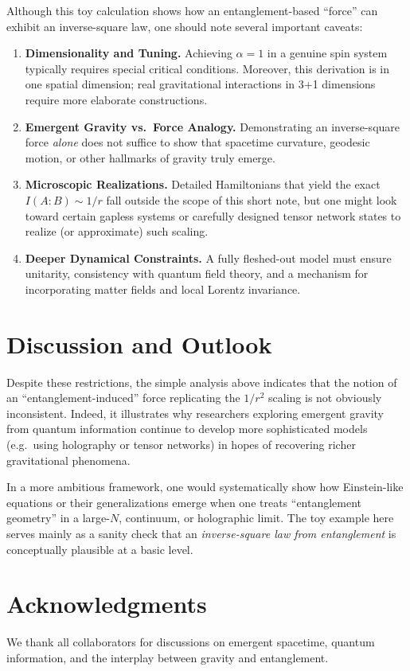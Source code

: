 \documentclass[12pt]{article}
\begin{document}
Although this toy calculation shows how an entanglement-based ``force'' 
can exhibit an inverse-square law, one should note several important 
caveats:

\begin{enumerate}
    \item \textbf{Dimensionality and Tuning.} 
    Achieving $\alpha = 1$ in a genuine spin system typically requires 
    special critical conditions. Moreover, this derivation is in 
    one spatial dimension; real gravitational interactions in 3+1 
    dimensions require more elaborate constructions.

    \item \textbf{Emergent Gravity vs.\ Force Analogy.} 
    Demonstrating an inverse-square force \emph{alone} does not 
    suffice to show that spacetime curvature, geodesic motion, 
    or other hallmarks of gravity truly emerge. 

    \item \textbf{Microscopic Realizations.} 
    Detailed Hamiltonians that yield the exact $I(A:B) \sim 1/r$ 
    fall outside the scope of this short note, but one might look 
    toward certain gapless systems or carefully designed tensor 
    network states to realize (or approximate) such scaling.

    \item \textbf{Deeper Dynamical Constraints.} 
    A fully fleshed-out model must ensure unitarity, consistency 
    with quantum field theory, and a mechanism for incorporating 
    matter fields and local Lorentz invariance. 
\end{enumerate}

\section{Discussion and Outlook}

Despite these restrictions, the simple analysis above indicates that 
the notion of an ``entanglement-induced'' force replicating the 
$1/r^2$ scaling is not obviously inconsistent. Indeed, it illustrates 
why researchers exploring emergent gravity from quantum information 
continue to develop more sophisticated models (e.g.\ using holography 
or tensor networks) in hopes of recovering richer gravitational 
phenomena.

In a more ambitious framework, one would systematically show how 
Einstein-like equations or their generalizations emerge when one 
treats ``entanglement geometry'' in a large-$N$, continuum, or 
holographic limit. The toy example here serves mainly as a sanity 
check that an \emph{inverse-square law from entanglement} is 
conceptually plausible at a basic level.

\section*{Acknowledgments}

We thank all collaborators for discussions on emergent spacetime, 
quantum information, and the interplay between gravity and entanglement.
\end{document}
